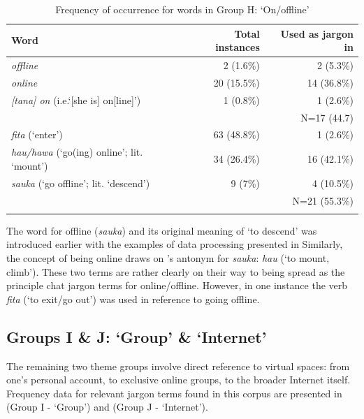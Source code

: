 \documentclass[output=paper
,newtxmath
,modfonts
,nonflat]{langsci/langscibook}
\begin{document}
\begin{table}
\begin{tabularx}{\textwidth}{Qrr}
\lsptoprule
Word & Total instances & Used as jargon in \\
\midrule
\textit{offline}                             & 2 (1.6\%) & 2 (5.3\%)\\
\textit{online}                              & 20 (15.5\%) & 14 (36.8\%)\\
\textit{[tana] on} (i.e.‘[she is] on[line]’) & 1 (0.8\%) & 1 (2.6\%)\\\midrule
& & N=17 (44.7)\\\midrule
\textit{fita} (‘enter’)                            & 63 (48.8\%) & 1 (2.6\%)\\
\textit{hau/hawa} (‘go(ing) online’; lit. ‘mount’) & 34 (26.4\%) & 16 (42.1\%)\\
\textit{sauka} (‘go offline’; lit. ‘descend’)      & 9 (7\%) & 4 (10.5\%)\\\midrule
& & N=21 (55.3\%)\\
\lspbottomrule
\end{tabularx}
\caption{Frequency of occurrence for words in Group H: ‘On/offline’}
\label{tab:purvis:10}
\end{table} 

The word for offline (\textit{sauka}) and its original meaning of ‘to descend’ was introduced earlier with the examples of data processing presented in  Similarly, the concept of being online draws on ’s antonym for \textit{sauka}: \textit{hau} (‘to mount, climb’). These two terms are rather clearly on their way to being spread as the principle  chat jargon terms for online/offline. However, in one instance the verb \textit{fita} (‘to exit/go out’) was used in reference to going offline.

\subsection{Groups I \& J: ‘Group’ \& ‘Internet’}

The remaining two theme groups involve direct reference to virtual spaces: from one’s personal account, to exclusive online groups, to the broader Internet itself. Frequency data for relevant jargon terms found in this corpus are presented in  (Group I - ‘Group’) and  (Group J - ‘Internet’).
\end{document}
